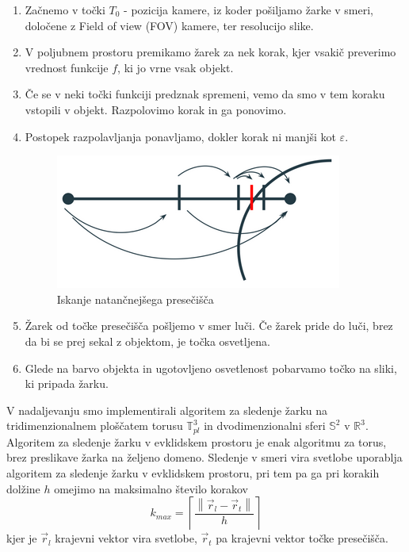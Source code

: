 \documentclass[titlepage]{article}
\begin{document}
\bigskip
\begin{enumerate}

\item Začnemo v točki \( T_{0} \) - pozicija kamere, iz koder pošiljamo žarke v smeri, določene z Field of view (FOV) kamere, ter resolucijo slike. 
\item V poljubnem prostoru premikamo žarek za nek korak, kjer vsakič preverimo vrednost funkcije \( f \), ki jo vrne vsak objekt.
\item Če se v neki točki funkciji predznak spremeni, vemo da smo v tem koraku vstopili v objekt. Razpolovimo korak in ga ponovimo.
\item Postopek razpolavljanja ponavljamo, dokler korak ni manjši kot \( \varepsilon \).

\begin{figure}[H]
    \centering
    \includegraphics[width=0.5\linewidth]{intersect.png}
    \caption{Iskanje natančnejšega presečišča}
    \label{Slika:Iskanje natančnejšega presečišča}
\end{figure}

\item Žarek od točke presečišča pošljemo v smer luči. Če žarek pride do luči, brez da bi se prej sekal z objektom, je točka osvetljena.
\item Glede na barvo objekta in ugotovljeno osvetlenost pobarvamo točko na sliki, ki pripada žarku.
\end{enumerate}

\bigskip
V nadaljevanju smo implementirali algoritem za sledenje žarku na tridimenzionalnem ploščatem torusu \( \mathbb{T}_{pl}^{3} \) in dvodimenzionalni sferi \( \mathbb{S}^2 \) v \( \mathbb{R}^3 \). Algoritem za sledenje žarku v evklidskem prostoru je enak algoritmu za torus, brez preslikave žarka na željeno domeno. Sledenje v smeri vira svetlobe uporablja algoritem za sledenje žarku v evklidskem prostoru, pri tem pa ga pri korakih dolžine \( h \) omejimo na maksimalno število korakov
\[ k_{max}= \left \lceil \frac{\left \|\vec{r}_{l}-\vec{r}_{t} \right \|}{h} \right \rceil \]
kjer je \( \vec{r}_{l} \) krajevni vektor vira svetlobe, \( \vec{r}_{t} \) pa krajevni vektor točke presečišča.
\end{document}

